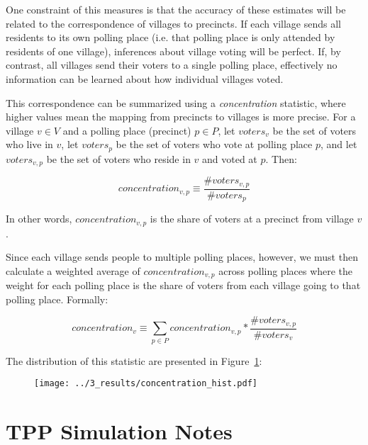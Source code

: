 \documentclass[12pt]{article}
\begin{document}
\begin{appendix}
One constraint of this measures is that the accuracy of these estimates will be related to the correspondence of villages to precincts. If each village sends all residents to its own polling place (i.e. that polling place is only attended by residents of one village), inferences about village voting will be perfect. If, by contrast, all villages send their voters to a single polling place, effectively no information can be learned about how individual villages voted.

This correspondence can be summarized using a \emph{concentration} statistic, where higher values mean the mapping from precincts to villages is more precise. For a village $v \in V$ and a polling place (precinct) $p \in P$, let $voters_{v}$ be the set of voters who live in $v$, let $voters_{p}$ be the set of voters who vote at polling place $p$, and let $voters_{v,p}$ be the set of voters who reside in $v$ and voted at $p$. Then:

\begin{equation}
 	concentration_{v,p} \equiv \frac{\#voters_{v,p}}{\#voters_{p}}
\end{equation}

In other words, $concentration_{v,p}$ is the share of voters at a precinct from village $v$.

Since each village sends people to multiple polling places, however, we must then calculate a weighted average of $concentration_{v,p}$ across polling places where the weight for each polling place is the share of voters from each village going to that polling place. Formally:

\begin{equation}
	concentration_{v} \equiv \sum_{p \in P} concentration_{v,p} * \frac{\#voters_{v,p}} { \# voters_{v}}
\end{equation}

The distribution of this statistic are presented in Figure~\ref{village_concentration}:

\begin{figure}[bht]
	\begin{center}
	    \caption{}\label{village_concentration}
    		\texttt{[image: ../3\_results/concentration\_hist.pdf]}
    \end{center}
\end{figure}
\pagebreak

\section{TPP Simulation Notes}\label{appendix_tpp_notes}



\end{appendix}
\end{document}
